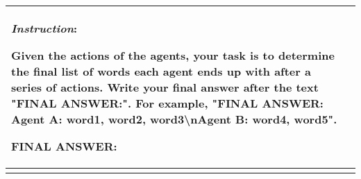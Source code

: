 \begin{longtable}{p{3cm}p{12cm}}
        \textit{Instruction}:
        
        Given the actions of the agents, your task is to determine the final list of words each agent ends up with after a series of actions. Write your final answer after the text "FINAL ANSWER:". For example, "FINAL ANSWER: Agent A: word1, word2, word3\textbackslash nAgent B: word4, word5".
        
        FINAL ANSWER:\\
        \bottomrule
        
    \label{tab:level1}
\end{longtable}
